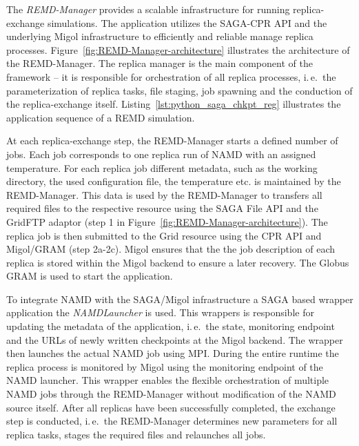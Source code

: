 \documentclass[times, 10pt, twocolumn]{article}
\begin{document}
The \emph{REMD-Manager} provides a scalable infrastructure for running
replica-exchange simulations.  The application utilizes the SAGA-CPR
API and the underlying Migol infrastructure to efficiently and
reliable manage replica
processes. Figure~\ref{fig:REMD-Manager-architecture} illustrates the
architecture of the REMD-Manager. The replica manager is the main
component of the framework -- it is responsible for orchestration of
all replica processes, i.\,e.\ the parameterization of replica tasks,
file staging, job spawning and the conduction of the replica-exchange
itself. Listing~\ref{lst:python_saga_chkpt_reg} illustrates the
application sequence of a REMD simulation.
 
At each replica-exchange step, the REMD-Manager starts a defined
number of jobs. Each job corresponds to one replica run of NAMD 
with an assigned temperature. 
For each replica job different metadata, such as the
working directory, the used configuration file, the temperature
etc. is maintained by the REMD-Manager.  This data is used by the REMD-Manager to
transfers all required files to the respective resource using the SAGA
File API and the GridFTP adaptor (step 1 in Figure~\ref{fig:REMD-Manager-architecture}). 
The replica job is then submitted to the Grid resource using  
the CPR API and Migol/GRAM (step 2a-2c). Migol ensures that the 
the job description of each replica is stored within the Migol backend to
ensure a later recovery.  The Globus GRAM is used to start the application.

To integrate NAMD with the SAGA/Migol infrastructure a SAGA based
wrapper application the \emph{NAMDLauncher} is used.  This wrappers is responsible for
updating the metadata of the application, i.\,e.\ the state,
monitoring endpoint and the URLs of newly written checkpoints at the
Migol backend.  The wrapper then launches the actual NAMD job using
MPI. During the entire runtime the replica process is monitored by 
Migol using the monitoring endpoint of the NAMD
launcher. This wrapper enables the flexible orchestration of multiple
NAMD jobs through the REMD-Manager without modification of the NAMD
source itself. After all replicas have been successfully completed,
the exchange step is conducted, i.\,e.\ the REMD-Manager determines
new parameters for all replica tasks, stages the required files and
relaunches all jobs.
\end{document}
